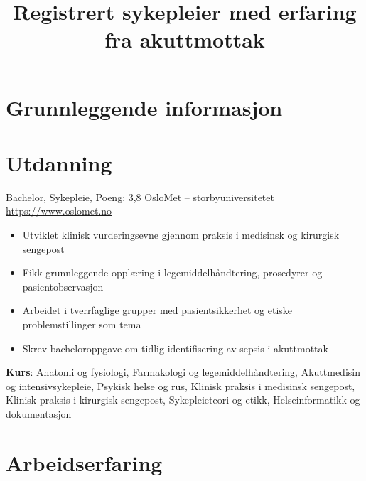 \documentclass[a4paper, serif, 10pt]{moderncv}
\title{Registrert sykepleier med erfaring fra akuttmottak}
\begin{document}
\maketitle

\section{Grunnleggende informasjon}

\section{Utdanning}

        {Bachelor, Sykepleie, Poeng: 3,8}
        {OsloMet – storbyuniversitetet}
        {\url{https://www.oslomet.no}}
        {}
        {\begin{itemize}
\item Utviklet klinisk vurderingsevne gjennom praksis i medisinsk og kirurgisk sengepost
\item Fikk grunnleggende opplæring i legemiddelhåndtering, prosedyrer og pasientobservasjon
\item Arbeidet i tverrfaglige grupper med pasientsikkerhet og etiske problemstillinger som tema
\item Skrev bacheloroppgave om tidlig identifisering av sepsis i akuttmottak
\end{itemize}
\textbf{Kurs}: Anatomi og fysiologi, Farmakologi og legemiddelhåndtering, Akuttmedisin og intensivsykepleie, Psykisk helse og rus, Klinisk praksis i medisinsk sengepost, Klinisk praksis i kirurgisk sengepost, Sykepleieteori og etikk, Helseinformatikk og dokumentasjon}
\section{Arbeidserfaring}
\end{document}
